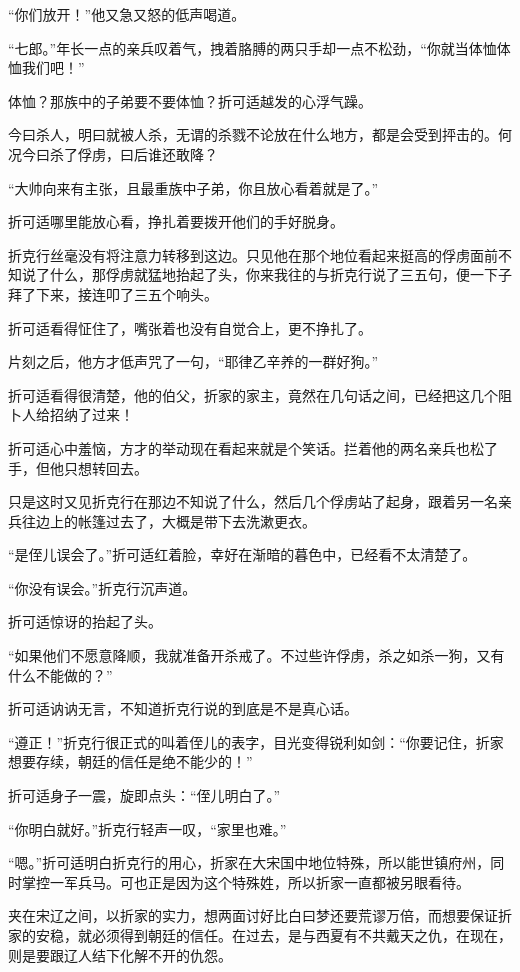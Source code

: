 “你们放开！”他又急又怒的低声喝道。

“七郎。”年长一点的亲兵叹着气，拽着胳膊的两只手却一点不松劲，“你就当体恤体恤我们吧！”

体恤？那族中的子弟要不要体恤？折可适越发的心浮气躁。

今曰杀人，明曰就被人杀，无谓的杀戮不论放在什么地方，都是会受到抨击的。何况今曰杀了俘虏，曰后谁还敢降？

“大帅向来有主张，且最重族中子弟，你且放心看着就是了。”

折可适哪里能放心看，挣扎着要拨开他们的手好脱身。

折克行丝毫没有将注意力转移到这边。只见他在那个地位看起来挺高的俘虏面前不知说了什么，那俘虏就猛地抬起了头，你来我往的与折克行说了三五句，便一下子拜了下来，接连叩了三五个响头。

折可适看得怔住了，嘴张着也没有自觉合上，更不挣扎了。

片刻之后，他方才低声咒了一句，“耶律乙辛养的一群好狗。”

折可适看得很清楚，他的伯父，折家的家主，竟然在几句话之间，已经把这几个阻卜人给招纳了过来！

折可适心中羞恼，方才的举动现在看起来就是个笑话。拦着他的两名亲兵也松了手，但他只想转回去。

只是这时又见折克行在那边不知说了什么，然后几个俘虏站了起身，跟着另一名亲兵往边上的帐篷过去了，大概是带下去洗漱更衣。

“是侄儿误会了。”折可适红着脸，幸好在渐暗的暮色中，已经看不太清楚了。

“你没有误会。”折克行沉声道。

折可适惊讶的抬起了头。

“如果他们不愿意降顺，我就准备开杀戒了。不过些许俘虏，杀之如杀一狗，又有什么不能做的？”

折可适讷讷无言，不知道折克行说的到底是不是真心话。

“遵正！”折克行很正式的叫着侄儿的表字，目光变得锐利如剑：“你要记住，折家想要存续，朝廷的信任是绝不能少的！”

折可适身子一震，旋即点头：“侄儿明白了。”

“你明白就好。”折克行轻声一叹，“家里也难。”

“嗯。”折可适明白折克行的用心，折家在大宋国中地位特殊，所以能世镇府州，同时掌控一军兵马。可也正是因为这个特殊姓，所以折家一直都被另眼看待。

夹在宋辽之间，以折家的实力，想两面讨好比白曰梦还要荒谬万倍，而想要保证折家的安稳，就必须得到朝廷的信任。在过去，是与西夏有不共戴天之仇，在现在，则是要跟辽人结下化解不开的仇怨。


